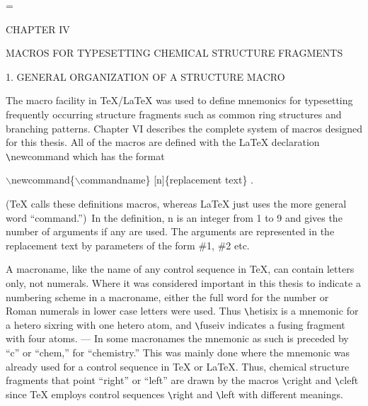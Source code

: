 
  \nofiles                          
  \def\LATEX{\LaTeX}
  \let\TEX = \TeX               
  \setcounter{totalnumber}{4}   
  \setcounter{topnumber}{2}     
  \setcounter{bottomnumber}{2}
  \renewcommand{\topfraction}{.5}
  \renewcommand{\bottomfraction}{.5}
  \setlength{\oddsidemargin}{3.9cm}     %
  \setlength{\textwidth}{5.7in}         %
  \setlength{\topmargin}{1cm}
  \setlength{\headheight}{.6cm}
  \setlength{\textheight}{8.5in}
  \setlength{\parindent}{1cm}
  \renewcommand{\baselinestretch}{1.5}
  \raggedbottom
  
  
  
  
      
  \setcounter{page}{24}
  \setcounter{chapter}{4}
  =\tenrm
  \initial
 
 \centerline{CHAPTER IV}
 \vspace{0.4cm}
 \centerline{MACROS FOR TYPESETTING CHEMICAL STRUCTURE FRAGMENTS}
 \vspace{0.4cm}
 \centerline{1. GENERAL ORGANIZATION OF A STRUCTURE MACRO}
 \vspace{0.4cm}
 The macro facility in TeX/LaTeX was used to define mnemonics for
 typesetting frequently occurring structure fragments such as 
 common ring structures and branching patterns. 
 Chapter VI describes the complete system of
 macros designed for this thesis. All of the macros
 are defined with the LaTeX declaration \verb+\+newcommand which
 has the format \\
 \centerline{$\backslash $newcommand\{$\backslash $commandname\}
 [n]\{replacement text\} .  }
 (TeX calls these definitions macros, whereas LaTeX just uses the
 more general word ``command.'')\ In the definition, n is an integer     
 from 1 to 9 and gives the number of arguments if any are used.
 The arguments are represented in the replacement text by
 parameters of the form \#1, \#2 etc. 
 
 A macroname, like the name of any control sequence in TeX, 
 can contain letters only, not numerals.  Where it was considered
 important in this thesis to indicate a numbering scheme in
 a macroname, either the full word for the number or Roman
 numerals in lower case letters were used. Thus \verb+\+hetisix
 is a mnemonic for a hetero sixring with one hetero atom, and
 \verb+\+fuseiv indicates a fusing fragment with four atoms. ---
 In some macronames the mnemonic as such is preceded by ``c''
 or ``chem,'' for ``chemistry.'' This was mainly done where the 
 mnemonic was already used for a control sequence in TeX
 or LaTeX. Thus, chemical structure fragments that point
 ``right'' or ``left'' are drawn by the macros \verb+\+cright
 and \verb+\+cleft since TeX employs control sequences
 \verb+\+right and \verb+\+left with different meanings.
 
